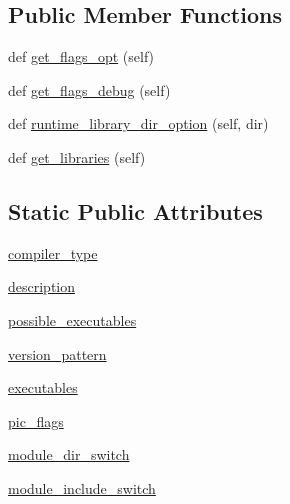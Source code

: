 \subsection*{Public Member Functions}
\begin{DoxyCompactItemize}
\item 
def \hyperlink{classnumpy_1_1distutils_1_1fcompiler_1_1fujitsu_1_1FujitsuFCompiler_a00070cd223ad11d506d5cc5e8538d8f1}{get\+\_\+flags\+\_\+opt} (self)
\item 
def \hyperlink{classnumpy_1_1distutils_1_1fcompiler_1_1fujitsu_1_1FujitsuFCompiler_ae6f604647a9e20a0f87f830ab4077cc0}{get\+\_\+flags\+\_\+debug} (self)
\item 
def \hyperlink{classnumpy_1_1distutils_1_1fcompiler_1_1fujitsu_1_1FujitsuFCompiler_a89d8a0946d9a4b07b10567460d2aa1a1}{runtime\+\_\+library\+\_\+dir\+\_\+option} (self, dir)
\item 
def \hyperlink{classnumpy_1_1distutils_1_1fcompiler_1_1fujitsu_1_1FujitsuFCompiler_aab06159fda0a876550b22583b25e0a24}{get\+\_\+libraries} (self)
\end{DoxyCompactItemize}
\subsection*{Static Public Attributes}
\begin{DoxyCompactItemize}
\item 
\hyperlink{classnumpy_1_1distutils_1_1fcompiler_1_1fujitsu_1_1FujitsuFCompiler_a95b9611cf16323b2c4e7928a72ee3eee}{compiler\+\_\+type}
\item 
\hyperlink{classnumpy_1_1distutils_1_1fcompiler_1_1fujitsu_1_1FujitsuFCompiler_ab74e9a299d3b20c885d249cb3bc56d1e}{description}
\item 
\hyperlink{classnumpy_1_1distutils_1_1fcompiler_1_1fujitsu_1_1FujitsuFCompiler_a713f3981c29ce04968ce46e8c6d026e0}{possible\+\_\+executables}
\item 
\hyperlink{classnumpy_1_1distutils_1_1fcompiler_1_1fujitsu_1_1FujitsuFCompiler_af064f4b521fd0566ea5a952f10757d49}{version\+\_\+pattern}
\item 
\hyperlink{classnumpy_1_1distutils_1_1fcompiler_1_1fujitsu_1_1FujitsuFCompiler_a8293fde8252d3f29748e596e13ba6c3d}{executables}
\item 
\hyperlink{classnumpy_1_1distutils_1_1fcompiler_1_1fujitsu_1_1FujitsuFCompiler_aeb437c1a6fa395fb3a09e0c1a8cb61f3}{pic\+\_\+flags}
\item 
\hyperlink{classnumpy_1_1distutils_1_1fcompiler_1_1fujitsu_1_1FujitsuFCompiler_a12d7905dfbd74e151b9992af10c14a3a}{module\+\_\+dir\+\_\+switch}
\item 
\hyperlink{classnumpy_1_1distutils_1_1fcompiler_1_1fujitsu_1_1FujitsuFCompiler_af407e2da174d99570942064731ece553}{module\+\_\+include\+\_\+switch}
\end{DoxyCompactItemize}


